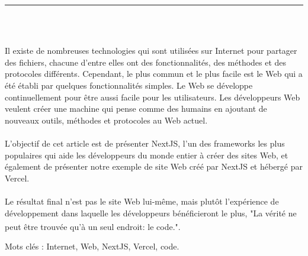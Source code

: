 \documentclass[12pt]{report}
\newenvironment{changemargin}[2]{%
\begin{list}{}{%
\setlength{\topsep}{0pt}%
\setlength{\leftmargin}{#1}%
\setlength{\rightmargin}{#2}%
\setlength{\listparindent}{\parindent}%
\setlength{\itemindent}{\parindent}%
\setlength{\parsep}{\parskip}%
}%
\item[]}{\end{list}}
\begin{document}
\begin{center}
    {\color{Blue} \rule{3in}{1.4mm} }\\
    \vspace{0.1in}
    \scshape{\fontsize{34}{46}{\bfseries{\color{Blue}{Résumé}}}}
    \\
    \vspace{0.6in}
\end{center}
\begin{changemargin}{0.9cm}{0.9cm}
Il existe de nombreuses technologies qui sont utilisées sur Internet pour partager des fichiers, chacune d’entre elles ont des fonctionnalités, des méthodes et des protocoles différents. Cependant, le plus commun et le plus facile est le Web qui a été établi par quelques fonctionnalités simples. Le Web se développe continuellement pour être aussi facile pour les utilisateurs. Les développeurs Web veulent créer une machine qui pense comme des humains en ajoutant de nouveaux outils, méthodes et protocoles au Web actuel.
\\\\
L’objectif de cet article est de présenter NextJS, l’un des frameworks les plus populaires qui aide les développeurs du monde entier à créer des sites Web, et également de présenter notre exemple de site Web créé par NextJS et hébergé par Vercel.
\\\\
    Le résultat final n’est pas le site Web lui-même, mais plutôt l’expérience de développement dans laquelle les développeurs bénéficieront le plus, "La vérité ne peut être trouvée qu’à un seul endroit: le code.". \textsuperscript{\cite{martin2018clean}}
\end{changemargin}

\vspace{1in}

\begin{changemargin}{0.9cm}{0.9cm}
Mots clés : Internet, Web, NextJS, Vercel, code.
\end{changemargin}

\newpage

\vspace*{0.2in}

\thispagestyle{empty}
\end{document}
